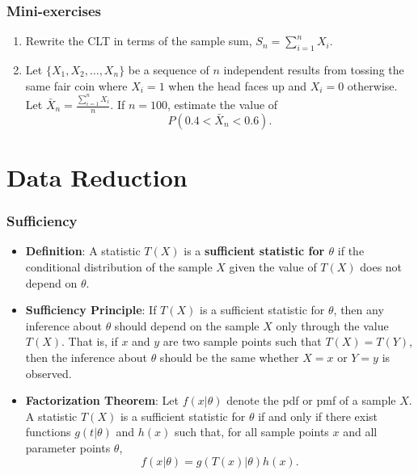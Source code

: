 \documentclass{beamer}
\begin{document}
\begin{frame}
\frametitle{Mini-exercises}
\begin{enumerate}
\item Rewrite the CLT in terms of the sample sum, $S_n = \sum_{i=1}^n X_i$.
\vspace*{1in}
\item Let $\{X_1,X_2,\ldots,X_n\}$ be a sequence of $n$ independent results from tossing the same fair coin where $X_i = 1$ when the head faces up and $X_i = 0$ otherwise. Let $\bar{X}_n = \frac{\sum_{i=1}^n X_i}{n}$. If $n=100$, estimate the value of 
$$
P(0.4 < \bar{X}_n < 0.6).
$$
\vspace*{0.7in}
\end{enumerate}
\end{frame}

\section{Data Reduction}
\begin{frame}
\frametitle{Sufficiency}
\begin{itemize}
\item \textbf{Definition}: A statistic $T(X)$ is a \textbf{sufficient statistic for $\theta$} if the conditional  distribution of the sample $X$ given the value of $T(X)$ does not depend on $\theta$.
\item \textbf{Sufficiency Principle}: If $T(X)$ is a sufficient statistic for $\theta$, then any inference about $\theta$ should depend on the sample $X$ only through the value $T(X)$. That is, if $x$ and $y$ are two sample points such that $T(X) = T(Y)$, then the inference about $\theta$ should be the same whether $X=x$ or $Y=y$ is observed.
\item \textbf{Factorization Theorem}: Let $f(x|\theta)$ denote the pdf or pmf of a sample $X$. A statistic $T(X)$ is a sufficient statistic for $\theta$ if and only if there exist functions $g(t|\theta)$ and $h(x)$ such that, for all sample points $x$ and all parameter points $\theta$,
$$
f(x|\theta) = g(T(x)|\theta)h(x).
$$
\end{itemize}
\end{frame}
\end{document}
